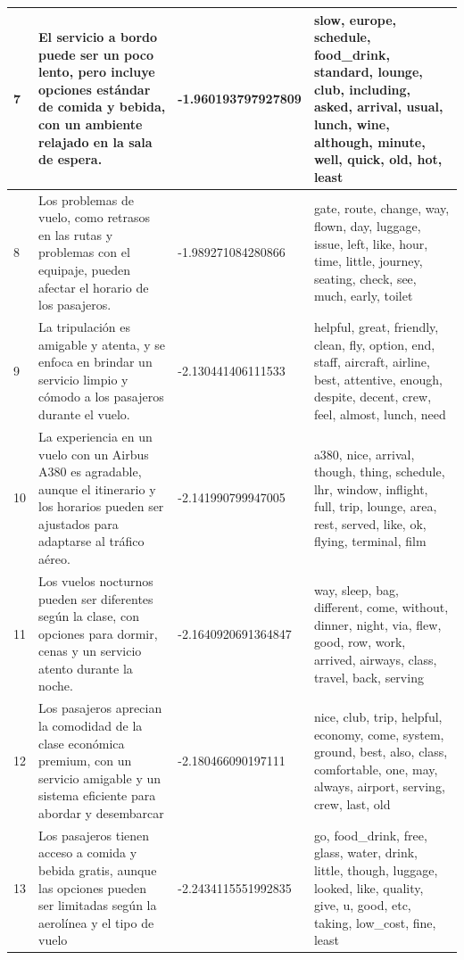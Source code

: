 \documentclass{report}
\begin{document}
{{\begin{longtable}{|p{1cm}|p{4cm}|p{4cm}|p{6cm}|}
                    \hline
                    7 & El servicio a bordo puede ser un poco lento, pero incluye opciones estándar de comida y bebida, con un ambiente relajado en la sala de espera. & -1.960193797927809 & slow, europe, schedule, food\_drink, standard, lounge, club, including, asked, arrival, usual, lunch, wine, although, minute, well, quick, old, hot, least \\
                    \hline
                    8 & Los problemas de vuelo, como retrasos en las rutas y problemas con el equipaje, pueden afectar el horario de los pasajeros. & -1.989271084280866 & gate, route, change, way, flown, day, luggage, issue, left, like, hour, time, little, journey, seating, check, see, much, early, toilet \\
                    \hline
                    9 & La tripulación es amigable y atenta, y se enfoca en brindar un servicio limpio y cómodo a los pasajeros durante el vuelo. & -2.130441406111533 & helpful, great, friendly, clean, fly, option, end, staff, aircraft, airline, best, attentive, enough, despite, decent, crew, feel, almost, lunch, need \\
                    \hline
                    10 & La experiencia en un vuelo con un Airbus A380 es agradable, aunque el itinerario y los horarios pueden ser ajustados para adaptarse al tráfico aéreo. & -2.141990799947005 & a380, nice, arrival, though, thing, schedule, lhr, window, inflight, full, trip, lounge, area, rest, served, like, ok, flying, terminal, film \\
                    \hline
                    11 & Los vuelos nocturnos pueden ser diferentes según la clase, con opciones para dormir, cenas y un servicio atento durante la noche. & -2.1640920691364847 & way, sleep, bag, different, come, without, dinner, night, via, flew, good, row, work, arrived, airways, class, travel, back, serving \\
                    \hline
                    12 & Los pasajeros aprecian la comodidad de la clase económica premium, con un servicio amigable y un sistema eficiente para abordar y desembarcar & -2.180466090197111 & nice, club, trip, helpful, economy, come, system, ground, best, also, class, comfortable, one, may, always, airport, serving, crew, last, old \\
                    \hline
                    13 & Los pasajeros tienen acceso a comida y bebida gratis, aunque las opciones pueden ser limitadas según la aerolínea y el tipo de vuelo & -2.2434115551992835 & go, food\_drink, free, glass, water, drink, little, though, luggage, looked, like, quality, give, u, good, etc, taking, low\_cost, fine, least \\

\end{longtable}}}
\end{document}
